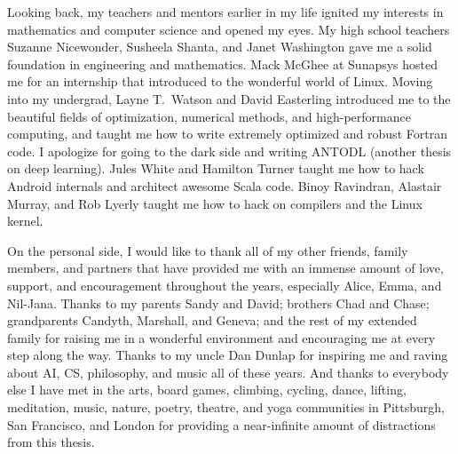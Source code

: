 \documentclass[12pt,masters]{cmuthesis}
\begin{document}
\begin{acknowledgments}
    Looking back, my teachers and mentors earlier in my life
    ignited my interests in mathematics and computer science
    and opened my eyes.
    My high school teachers
    Suzanne Nicewonder,
    Susheela Shanta, and
    Janet Washington gave me a solid foundation
    in engineering and mathematics.
    Mack McGhee at Sunapsys hosted me for an
    internship that introduced to the wonderful
    world of Linux.
    Moving into my undergrad,
    Layne T.~Watson and David Easterling
    introduced me to the beautiful fields
    of optimization, numerical methods, and
    high-performance computing, and taught me how to
    write extremely optimized and robust Fortran code.
    I apologize for going to the dark side and writing
    ANTODL (another thesis on deep learning).
    Jules White and Hamilton Turner taught me how
    to hack Android internals and architect awesome Scala code.
    Binoy Ravindran, Alastair Murray, and Rob Lyerly
    taught me how to hack on compilers
    and the Linux kernel.

    On the personal side, I would like to thank all of my
    other friends, family members, and partners that
    have provided me with an immense amount of love,
    support, and encouragement throughout the years,
    especially Alice, Emma, and Nil-Jana.
    Thanks to my parents Sandy and David;
    brothers Chad and Chase;
    grandparents Candyth, Marshall, and Geneva;
    and the rest of my extended family
    for raising me in a wonderful environment and
    encouraging me at every step along the way.
    Thanks to my uncle Dan Dunlap for inspiring me and
    raving about AI, CS, philosophy, and music all of these years.
    And thanks to everybody else I have met in the
    arts,
    board games,
    climbing,
    cycling,
    dance,
    lifting,
    meditation,
    music,
    nature,
    poetry,
    theatre, and
    yoga
    communities in Pittsburgh, San Francisco, and London for
    providing a near-infinite amount of distractions from
    this thesis.
\end{acknowledgments}

\pagestyle{plain}

\tableofcontents
{}
\listoffigures
{}
\listoftables
\listofalgorithms

\mainmatter



\end{document}
